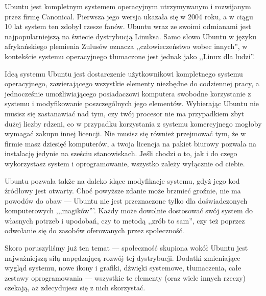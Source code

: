 Ubuntu jest kompletnym systemem operacyjnym utrzymywanym i rozwijanym przez firmę Canonical. Pierwsza jego wersja ukazała się w 2004 roku, a w ciągu 10 lat system ten zdobył rzesze fanów. Ubuntu wraz ze swoimi odmianami jest najpopularniejszą na świecie dystrybucją Linuksa. Samo słowo Ubuntu w języku afrykańskiego plemienia Zulusów oznacza ,,człowieczeństwo wobec innych'', w kontekście systemu operacyjnego tłumaczone jest jednak jako ,,Linux dla ludzi''.

Ideą systemu Ubuntu jest dostarczenie użytkownikowi kompletnego systemu operacyjnego, zawierającego wszystkie elementy niezbędne do codziennej pracy, a jednocześnie umożliwiającego posiadaczowi komputera swobodne korzystanie z systemu i modyfikowanie poszczególnych jego elementów. Wybierając Ubuntu nie musisz się zastanawiać nad tym, czy twój procesor nie ma przypadkiem zbyt dużej liczby rdzeni, co w przypadku korzystania z systemu komercyjnego mogłoby wymagać zakupu innej licencji. Nie musisz się również przejmować tym, że w firmie masz dziesięć komputerów, a twoja licencja na pakiet biurowy pozwala na instalację jedynie na sześciu stanowiskach. Jeśli chodzi o to, jak i do czego wykorzystasz system i oprogramowanie, wszystko zależy wyłącznie od ciebie.

Ubuntu pozwala także na daleko idące modyfikacje systemu, gdyż jego kod źródłowy jest otwarty. Choć powyższe zdanie może brzmieć groźnie, nie ma powodów do obaw --- Ubuntu nie jest przeznaczone tylko dla doświadczonych komputerowych ,,,magików'''. Każdy może dowolnie dostosować swój system do własnych potrzeb i upodobań, czy to metodą ,,zrób to sam'', czy też poprzez odwołanie się do zasobów oferowanych przez społeczność.

Skoro poruszyliśmy już ten temat --- społeczność skupiona wokół Ubuntu jest najważniejszą siłą napędzającą rozwój tej dystrybucji. Dodatki zmieniające wygląd systemu, nowe ikony i grafiki, dźwięki systemowe, tłumaczenia, całe zestawy oprogramowania --- wszystkie te elementy (oraz wiele innych rzeczy) czekają, aż zdecydujesz się z nich skorzystać.
